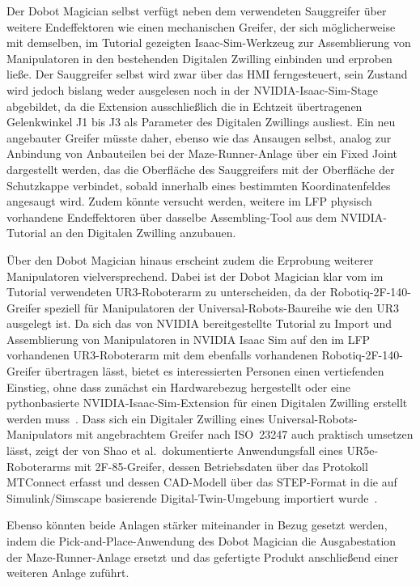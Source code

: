 Der Dobot Magician selbst verfügt neben dem verwendeten Sauggreifer über weitere Endeffektoren wie einen mechanischen Greifer, der sich möglicherweise mit demselben, im Tutorial gezeigten Isaac-Sim-Werkzeug zur Assemblierung von Manipulatoren in den bestehenden Digitalen Zwilling einbinden und erproben ließe.
Der Sauggreifer selbst wird zwar über das HMI ferngesteuert, sein Zustand wird jedoch bislang weder ausgelesen noch in der NVIDIA-Isaac-Sim-Stage abgebildet, da die Extension ausschließlich die in Echtzeit übertragenen Gelenkwinkel J1 bis J3 als Parameter des Digitalen Zwillings ausliest.
Ein neu angebauter Greifer müsste daher, ebenso wie das Ansaugen selbst, analog zur Anbindung von Anbauteilen bei der Maze-Runner-Anlage über ein Fixed Joint dargestellt werden, das die Oberfläche des Sauggreifers mit der Oberfläche der Schutzkappe verbindet, sobald innerhalb eines bestimmten Koordinatenfeldes angesaugt wird.
Zudem könnte versucht werden, weitere im LFP physisch vorhandene Endeffektoren über dasselbe Assembling-Tool aus dem NVIDIA-Tutorial an den Digitalen Zwilling anzubauen.

Über den Dobot Magician hinaus erscheint zudem die Erprobung weiterer Manipulatoren vielversprechend. Dabei ist der Dobot Magician klar vom im Tutorial verwendeten UR3-Roboterarm zu unterscheiden, da der Robotiq-2F-140-Greifer speziell für Manipulatoren der Universal-Robots-Baureihe wie den UR3 ausgelegt ist. Da sich das von NVIDIA bereitgestellte Tutorial zu Import und Assemblierung von Manipulatoren in NVIDIA Isaac Sim auf den im LFP vorhandenen UR3-Roboterarm mit dem ebenfalls vorhandenen Robotiq-2F-140-Greifer übertragen lässt, bietet es interessierten Personen einen vertiefenden Einstieg, ohne dass zunächst ein Hardwarebezug hergestellt oder eine pythonbasierte NVIDIA-Isaac-Sim-Extension für einen Digitalen Zwilling erstellt werden muss~\cite{nvidia_isaacsim_manipulator_tutorial}. Dass sich ein Digitaler Zwilling eines Universal-Robots-Manipulators mit angebrachtem Greifer nach ISO~23247 auch praktisch umsetzen lässt, zeigt der von Shao et al.\ dokumentierte Anwendungsfall eines UR5e-Roboterarms mit 2F-85-Greifer, dessen Betriebsdaten über das Protokoll MTConnect erfasst und dessen CAD-Modell über das STEP-Format in die auf Simulink/Simscape basierende Digital-Twin-Umgebung importiert wurde~\cite{shao2023standardized}.

Ebenso könnten beide Anlagen stärker miteinander in Bezug gesetzt werden, indem die Pick-and-Place-Anwendung des Dobot Magician die Ausgabestation der Maze-Runner-Anlage ersetzt und das gefertigte Produkt anschließend einer weiteren Anlage zuführt.

